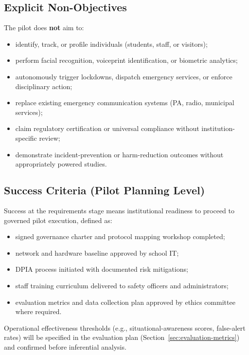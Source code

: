 \subsection{Explicit Non-Objectives}

The pilot does \textbf{not} aim to:
\begin{itemize}[noitemsep]
  \item identify, track, or profile individuals (students, staff, or visitors);
  \item perform facial recognition, voiceprint identification, or biometric analytics;
  \item autonomously trigger lockdowns, dispatch emergency services, or enforce disciplinary action;
  \item replace existing emergency communication systems (PA, radio, municipal services);
  \item claim regulatory certification or universal compliance without institution-specific review;
  \item demonstrate incident-prevention or harm-reduction outcomes without appropriately
        powered studies.
\end{itemize}

\subsection{Success Criteria (Pilot Planning Level)}

Success at the requirements stage means institutional readiness to proceed to governed
pilot execution, defined as:

\begin{itemize}[noitemsep]
  \item signed governance charter and protocol mapping workshop completed;
  \item network and hardware baseline approved by school IT;
  \item DPIA process initiated with documented risk mitigations;
  \item staff training curriculum delivered to safety officers and administrators;
  \item evaluation metrics and data collection plan approved by ethics committee where required.
\end{itemize}

Operational effectiveness thresholds (e.g., situational-awareness scores, false-alert rates)
will be specified in the evaluation plan (Section~\ref{sec:evaluation-metrics}) and
confirmed before inferential analysis.
